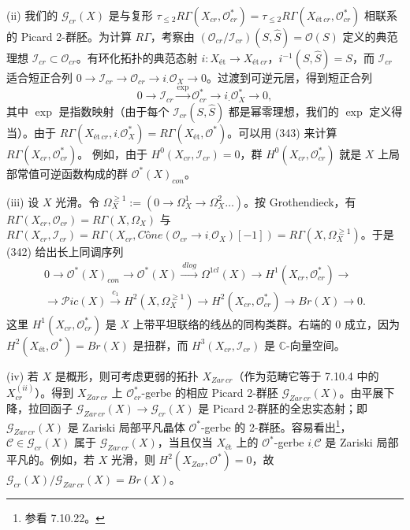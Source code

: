 (ii) 我们的 $\mathcal{G}_{cr}(X)$ 是与复形 $\tau_{\leq2}R\Gamma(X_{cr},\mathcal{O}^{*}_{cr})=\tau_{\leq2}R\Gamma(X_{\text{ét}\,cr},\mathcal{O}^{*}_{cr})$ 相联系的 Picard 2-群胚。为计算 $R\Gamma$，考察由 $(\mathcal{O}_{cr}/\mathcal{I}_{cr})(S,\hat S)=\mathcal{O}(S)$ 定义的典范理想 $\mathcal{I}_{cr}\subset\mathcal{O}_{cr}$。有环化拓扑的典范态射 $i:X_{\text{ét}}\to X_{\text{ét}\,cr}$，$i^{-1}(S,\hat S)=S$，而 $\mathcal{I}_{cr}$ 适合短正合列 $0\to\mathcal{I}_{cr}\to\mathcal{O}_{cr}\to i_{\cdot}\mathcal{O}_{X}\to 0$。过渡到可逆元层，得到短正合列
\begin{equation}\tag{342}
0\longrightarrow\mathcal{I}_{cr}\xrightarrow{\exp}\mathcal{O}^{*}_{cr}\longrightarrow i_{\cdot}\mathcal{O}^{*}_{X}\longrightarrow 0,
\end{equation}
其中 $\exp$ 是指数映射（由于每个 $\mathcal{I}_{cr}(S,\hat S)$ 都是幂零理想，我们的 $\exp$ 定义得当）。由于 $R\Gamma(X_{\text{ét}\,cr},i_{\cdot}\mathcal{O}^{*}_{X})=R\Gamma(X_{\text{ét}},\mathcal{O}^{*})$。可以用 (343) 来计算 $R\Gamma(X_{cr},\mathcal{O}^{*}_{cr})$。%
例如，由于 $H^{0}(X_{cr},\mathcal{I}_{cr})=0$，群 $H^{0}(X_{cr},\mathcal{O}^{*}_{cr})$ 就是 $X$ 上局部常值可逆函数构成的群 $\mathcal{O}^{*}(X)_{con}$。

(iii) 设 $X$ 光滑。令 $\Omega^{\geq1}_{X}:=(0\to\Omega^{1}_{X}\to\Omega^{2}_{X}\ldots)$。按 Grothendieck，有 $R\Gamma(X_{cr},\mathcal{O}_{cr})=R\Gamma(X,\Omega_{X})$ 与 $R\Gamma(X_{cr},\mathcal{I}_{cr})=R\Gamma(X_{cr},\mathit{Cône}(\mathcal{O}_{cr}\to i_{\cdot}\mathcal{O}_{X})[-1])=R\Gamma(X,\Omega^{\geq1}_{X})$。于是 (342) 给出长上同调序列
\[
\begin{gathered}
0\longrightarrow\mathcal{O}^{*}(X)_{con}\longrightarrow\mathcal{O}^{*}(X)\xrightarrow{\ dlog\ }\Omega^{1cl}(X)\longrightarrow H^{1}(X_{cr},\mathcal{O}^{*}_{cr})\longrightarrow\\
\longrightarrow\mathcal{P}ic(X)\xrightarrow{\ c_{1}\ }H^{2}(X,\Omega^{\geq1}_{X})\longrightarrow H^{2}(X_{cr},\mathcal{O}^{*}_{cr})\longrightarrow Br(X)\longrightarrow0.
\end{gathered}
\]
这里 $H^{1}(X_{cr},\mathcal{O}^{*}_{cr})$ 是 $X$ 上带平坦联络的线丛的同构类群。右端的 0 成立，因为 $H^{2}(X_{\text{ét}},\mathcal{O}^{*})=Br(X)$ 是扭群，而 $H^{3}(X_{cr},\mathcal{I}_{cr})$ 是 $\mathbb{C}$-向量空间。

(iv) 若 $X$ 是概形，则可考虑更弱的拓扑 $X_{Zar\,cr}$（作为范畴它等于 7.10.4 中的 $X^{(ii)}_{cr}$）。得到 $X_{Zar\,cr}$ 上 $\mathcal{O}^{*}_{cr}$-gerbe 的相应 Picard 2-群胚 $\mathcal{G}_{Zar\,cr}(X)$。由平展下降，拉回函子 $\mathcal{G}_{Zar\,cr}(X)\to\mathcal{G}_{cr}(X)$ 是 Picard 2-群胚的全忠实态射；即 $\mathcal{G}_{Zar\,cr}(X)$ 是 Zariski 局部平凡晶体 $\mathcal{O}^{*}$-gerbe 的 2-群胚。容易看出\footnote{参看 7.10.22。}，$\mathcal{C}\in\mathcal{G}_{cr}(X)$ 属于 $\mathcal{G}_{Zar\,cr}(X)$，当且仅当 $X_{\text{ét}}$ 上的 $\mathcal{O}^{*}$-gerbe $i_{\cdot}\mathcal{C}$ 是 Zariski 局部平凡的。例如，若 $X$ 光滑，则 $H^{2}(X_{Zar},\mathcal{O}^{*})=0$，故 $\mathcal{G}_{cr}(X)/\mathcal{G}_{Zar\,cr}(X)=Br(X)$。

